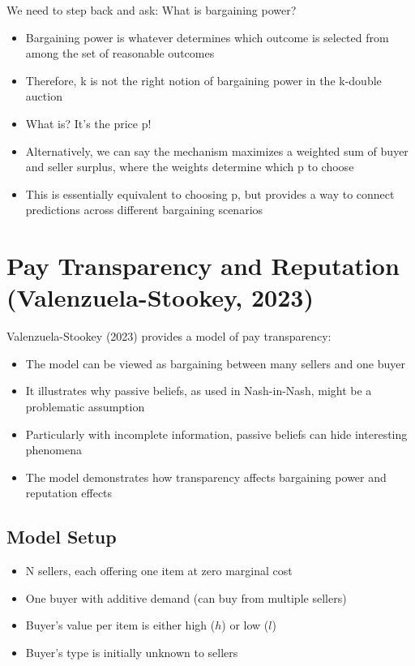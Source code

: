 \documentclass[11pt]{elegantbook_2}
\begin{document}
\begin{remark}
    We need to step back and ask: What is bargaining power?
    \begin{itemize}
        \item Bargaining power is whatever determines which outcome is selected from among the set of reasonable outcomes
        \item Therefore, k is not the right notion of bargaining power in the k-double auction
        \item What is? It's the price p!
        \item Alternatively, we can say the mechanism maximizes a weighted sum of buyer and seller surplus, where the weights determine which p to choose
        \item This is essentially equivalent to choosing p, but provides a way to connect predictions across different bargaining scenarios
    \end{itemize}
\end{remark}



\section{Pay Transparency and Reputation (Valenzuela-Stookey, 2023)}
Valenzuela-Stookey (2023) provides a model of pay transparency:
\begin{itemize}
    \item The model can be viewed as bargaining between many sellers and one buyer
    \item It illustrates why passive beliefs, as used in Nash-in-Nash, might be a problematic assumption
    \item Particularly with incomplete information, passive beliefs can hide interesting phenomena
    \item The model demonstrates how transparency affects bargaining power and reputation effects
\end{itemize}

\subsection{Model Setup}
\begin{itemize}
    \item N sellers, each offering one item at zero marginal cost
    \item One buyer with additive demand (can buy from multiple sellers)
    \item Buyer's value per item is either high ($h$) or low ($l$)
    \item Buyer's type is initially unknown to sellers
\end{itemize}
\end{document}
